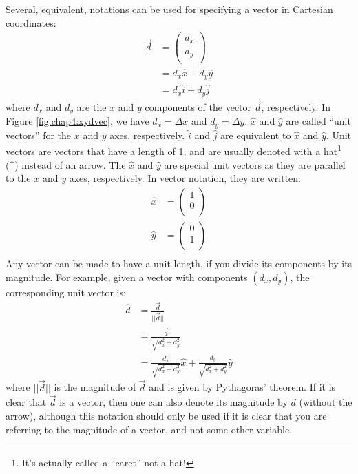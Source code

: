 Several, equivalent, notations can be used for specifying a vector in Cartesian coordinates:
\begin{align*}
\vec d &= \begin{pmatrix}
           d_x \\
           d_y \\
         \end{pmatrix}\\
         &= d_x\hat x +d_y \hat y\\
         &=d_x\hat i +d_y \hat j
\end{align*}
where $d_x$ and $d_y$ are the $x$ and $y$ components of the vector $\vec d$, respectively. In Figure \ref{fig:chap4:xydvec}, we have $d_x=\Delta x$ and $d_y=\Delta y$. $\hat x$ and $\hat y$ are called ``unit vectors'' for the $x$ and $y$ axes, respectively. $\hat i$ and $\hat j$ are equivalent to $\hat x$ and $\hat y$.  Unit vectors are vectors that have a length of 1, and are usually denoted with a hat\footnote{It's actually called a ``caret'' not a hat!} (\^{}) instead of an arrow. The $\hat x$ and $\hat y$ are special unit vectors as they are parallel to the $x$ and $y$ axes, respectively. In vector notation, they are written:
\begin{align*}
\hat x &= \begin{pmatrix}
           1\\
           0 \\
         \end{pmatrix}\\
\hat y &= \begin{pmatrix}
           0\\
           1 \\
         \end{pmatrix}\\       
\end{align*}
Any vector can be made to have a unit length, if you divide its components by its magnitude. For example, given a vector with components $(d_x,d_y)$, the corresponding unit vector is:
\begin{align*}
\hat d &= \frac{\vec d}{||\vec d||}\\
       &= \frac{\vec d}{\sqrt{d_x^2+d_y^2}}\\
       &= \frac{d_x}{\sqrt{d_x^2+d_y^2}}\hat x+\frac{d_y}{\sqrt{d_x^2+d_y^2}}\hat y
\end{align*}
where $||\vec d||$ is the magnitude of $\vec d$ and is given by Pythagoras' theorem. If it is clear that $\vec d$ is a vector, then one can also denote its magnitude by $d$ (without the arrow), although this notation should only be used if it is clear that you are referring to the magnitude of a vector, and not some other variable.

